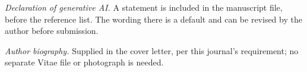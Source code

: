 \documentclass[12pt]{article}
\begin{document}
\vspace{0.8em}
\noindent\textit{Declaration of generative AI.} A statement is included in the
manuscript file, before the reference list. The wording there is a default
and can be revised by the author before submission.

\vspace{0.8em}
\noindent\textit{Author biography.} Supplied in the cover letter, per this
journal's requirement; no separate Vitae file or photograph is needed.
\end{document}
